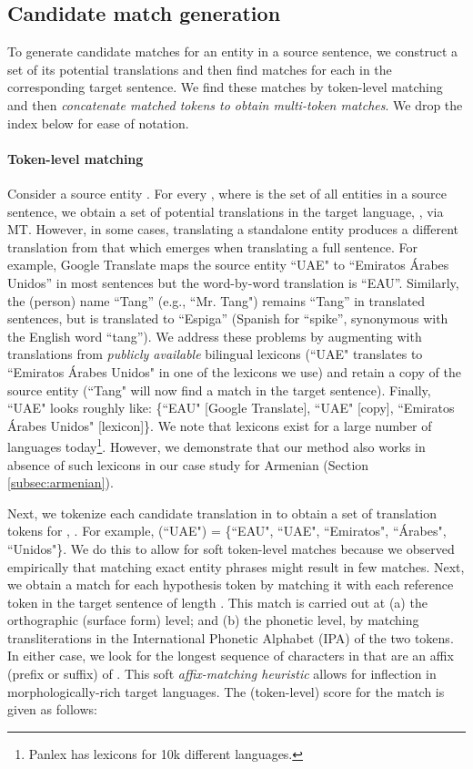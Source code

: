 \documentclass[11pt,a4paper]{article}
\begin{document}
\subsection{Candidate match generation \label{sec:cand-match-gen}}
To generate candidate matches for an entity in a source sentence, 
we construct a set of its potential translations 
and then find matches for each  in the corresponding target sentence. 
We find these matches by token-level matching and then
\emph{concatenate matched tokens to obtain multi-token matches}. We drop the index  below for ease of notation.


\paragraph{Token-level matching \label{sec:tok-level}}
Consider a source entity . 
For every , 
where  is the set of all entities in a source sentence, 
we obtain a set of potential translations in the target language, , 
via MT.
However, in some cases, 
translating a standalone entity
produces a different translation 
from that which emerges when translating 
a full sentence.
For example, Google Translate maps the source entity ``UAE"
to ``Emiratos \'Arabes Unidos'' in most sentences 
but the word-by-word translation is ``EAU''. 
Similarly, the (person) name ``Tang'' (e.g., ``Mr. Tang") 
remains ``Tang'' in translated sentences, 
but is translated to ``Espiga'' 
(Spanish for ``spike'', synonymous 
with the English word ``tang''). 
We address these problems by augmenting  
with translations
from \emph{publicly available} bilingual lexicons 
(``UAE" translates to ``Emiratos \'Arabes Unidos" in one of the lexicons we use) 
and retain
a copy of the source entity 
(``Tang" will now find a match in the target sentence). 
Finally, ``UAE" looks roughly like: 
\{``EAU" [Google Translate], ``UAE" [copy], ``Emiratos \'Arabes Unidos" [lexicon]\}. 
We note that lexicons exist for a large number of languages today\footnote{Panlex \cite{kamholz2014panlex} has lexicons for 10k different languages.}.
However, we demonstrate that our method 
also works in absence of such lexicons 
in our case study for Armenian 
(Section \ref{subsec:armenian}).




Next, we tokenize each candidate translation in  
to obtain a set of translation tokens for , . 
For example, (``UAE") = \{``EAU", ``UAE", ``Emiratos", ``\'Arabes", ``Unidos"\}. 
We do this to allow for soft token-level matches 
because we observed empirically 
that matching exact entity phrases might result in few matches.
Next, we obtain a match for each hypothesis token 
by matching it with each reference token  
in the target sentence  of length .
This match is carried out at
(a) the orthographic (surface form) level; 
and (b) the phonetic level, 
by matching transliterations in the International Phonetic Alphabet (IPA) of the two tokens. 
In either case, we look for the longest sequence of characters in 
that are an affix (prefix or suffix) of . 
This soft \emph{affix-matching heuristic} allows 
for inflection in morphologically-rich target languages. 
The (token-level) score for the match is given as follows:
\end{document}
